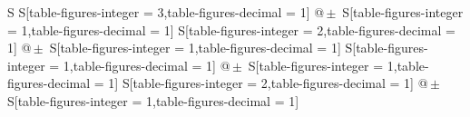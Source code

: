 \begin{table}[h]
\centering
\caption{Die Messwerte und die bereits berechneten Werte für die Wärmekapazitäten.}
\begin{tabular}{
	S
	S[table-figures-integer = 3,table-figures-decimal = 1]
	@{\,$\pm{}$\,}
	S[table-figures-integer = 1,table-figures-decimal = 1]
	S[table-figures-integer = 2,table-figures-decimal = 1]
	@{\,$\pm{}$\,}
	S[table-figures-integer = 1,table-figures-decimal = 1]
	S[table-figures-integer = 1,table-figures-decimal = 1]
	@{\,$\pm{}$\,}
	S[table-figures-integer = 1,table-figures-decimal = 1]
	S[table-figures-integer = 2,table-figures-decimal = 1]
	@{\,$\pm{}$\,}
	S[table-figures-integer = 1,table-figures-decimal = 1]}


\end{tabular}
\end{table}
